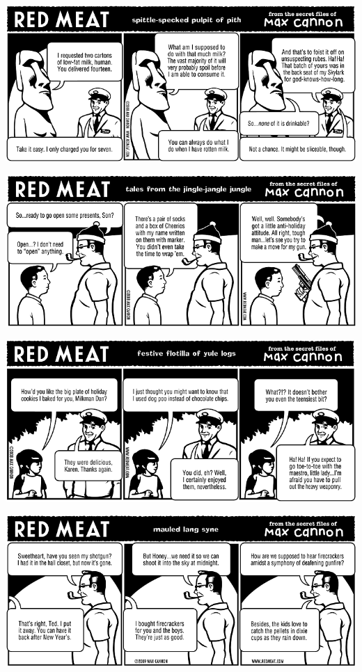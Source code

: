 \documentclass[a4paper,twoside,11pt]{article}
\begin{document}
\includegraphics[width=\textwidth]{redmeat_2008-12-16.png}



\includegraphics[width=\textwidth]{redmeat_2008-12-23.png}



\includegraphics[width=\textwidth]{redmeat_2008-12-30.png}



\includegraphics[width=\textwidth]{redmeat_2009-01-06.png}
\end{document}

